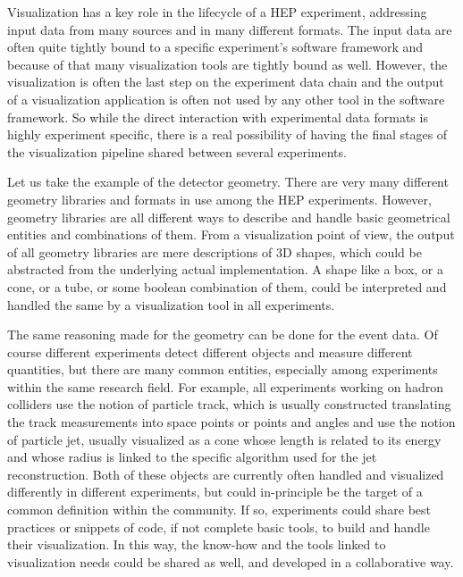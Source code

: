 \documentclass[12pt,a4paper]{article}
\begin{document}
Visualization has a key role in the lifecycle of a HEP experiment, addressing input data from many sources and in many different formats.
The input data are often quite tightly bound to a specific experiment's software framework and because of that many visualization tools
are tightly bound as well. However, the visualization is often the last step on the experiment data chain and the
output of a visualization application is often not used by any other tool in the software framework. So while the direct interaction with experimental data
formats is highly experiment specific, there is a real possibility of having the final stages of the visualization pipeline
shared between several experiments.

Let us take the example of the detector geometry. There are very many different geometry libraries and formats in use among the HEP experiments.
However, geometry libraries are all different ways to describe and handle basic geometrical entities and combinations of them.
From a visualization point of view, the output of all geometry libraries are mere descriptions of 3D shapes, which could be abstracted
from the underlying actual implementation. A shape like a box, or a cone, or a tube, or some boolean combination of them, could be
interpreted and handled the same by a visualization tool in all experiments.

The same reasoning made for the geometry can be done for the event data. Of course different experiments detect different objects
and measure different quantities, but there are many common entities, especially among experiments within the same research field.
For example, all experiments working on hadron colliders use the notion of particle track, which is usually constructed translating
the track measurements into space points or points and angles and use the notion of particle jet, usually
visualized as a cone whose length is related to its energy and whose radius is linked to the specific algorithm used for the jet
reconstruction. Both of these objects are currently often handled and visualized differently in different experiments, but could in-principle
be the target of a common definition within the community. If so, experiments could share best practices or snippets of code,
if not complete basic tools, to build and handle their visualization. In this way, the know-how and the tools linked to visualization needs
could be shared as well, and developed in a collaborative way.

\end{document}

